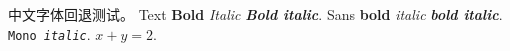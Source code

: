 \documentclass[type=bachelor,font-path=none]{suepthesis}
\begin{document}
中文字体回退测试。
Text \textbf{Bold} \textit{Italic} \textbf{\textit{Bold italic}}.
\textsf{Sans \textbf{bold} \textit{italic} \textbf{\textit{bold italic}}}.
\texttt{Mono \textit{italic}}. $x + y = 2$.
\end{document}
